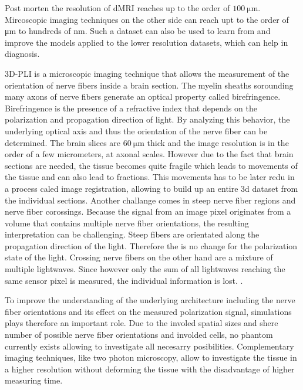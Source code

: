Post morten the resolution of \ac{dMRI} reaches up to the order of $\SI{100}{\micro\meter}$.
Mircoscopic imaging techniques on the other side can reach upt to the order of \si{\micro\meter} to hundreds of \si{\nano\meter}.
Such a dataset can also be used to learn from and improve the models applied to the lower resolution datasets, which can help in diagnosis. \cite{MaierHein2017, Schilling2021, Yendiki2021, Costantini2021}
\par
% 
\ac{3D-PLI} is a microscopic imaging technique that allows the measurement of the orientation of nerve fibers inside a brain section.
The myelin sheaths sorounding many axons of nerve fibers generate an optical property called birefringence.
Birefringence is the presence of a refractive index that depends on the polarization and propagation direction of light.
By analyzing this behavior, the underlying optical axis and thus the orientation of the nerve fiber can be determined.
The brain slices are $\SI{60}{\micro\meter}$ thick and the image resolution is in the order of a few micrometers, \ie{} at axonal scales.
However due to the fact that brain sections are needed, the tissue becomes quite fragile which leads to movements of the tissue and can also lead to fractions.
This movements has to be later redu in a process caled image registration, allowing to build up an entire 3d dataset from the individual sections.
Another challange comes in steep nerve fiber regions and nerve fiber corossings.
Because the signal from an image pixel originates from a volume that contains multiple nerve fiber orientations, the resulting interpretation can be challenging.
Steep fibers are \eg{} orientated along the propagation direction of the light.
Therefore the is no change for the polarization state of the light.
Crossing nerve fibers on the other hand are a mixture of multiple lightwaves.
Since however only the sum of all lightwaves reaching the same sensor pixel is measured, the individual information is lost.
. \cite{Axer2011a, Axer2011, Axer2016}
\par
% 
To improve the understanding of the underlying architecture including the nerve fiber orientations and its effect on the measured polarization signal, simulations plays therefore an important role.
Due to the involed spatial sizes and shere number of possible nerve fiber orientations and involded cells, no phantom currently exists allowing to investigate all necesarry posibilities.
Complementary imaging techniques, like two photon microscopy, allow to investigate the tissue in a higher resolution without deforming the tissue with the disadvantage of higher measuring time.
